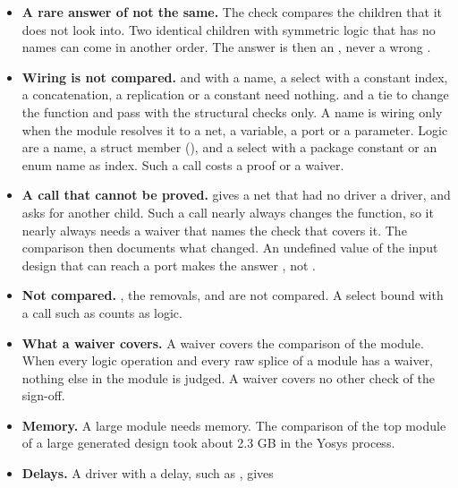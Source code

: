 \begin{itemize}
  That edge assumes every output of a child depends on every other pin of it, which is not
  always true. A value that reads a net which a child drives, and which does not in fact
  carry the loop, is refused as well. A package constant, such as , is refused
  although it can never be part of a loop. Its first name is not a member of the module.
\item \textbf{A rare answer of not the same.} The check compares the children that it does
  not look into. Two identical children with symmetric logic that has no names can come in
  another order. The answer is then an , never a wrong .
\item \textbf{Wiring is not compared.}  and
   with a name, a select with a constant index, a concatenation,
  a replication or a constant need nothing.  and a tie to
   change the function and pass with the structural checks only. A name is
  wiring only when the module resolves it to a net, a variable, a port or a parameter.
  Logic are a  name, a struct member (), and a select
  with a package constant or an enum name as index. Such a call costs a proof or a waiver.
\item \textbf{A call that cannot be proved.}  gives a net that had
  no driver a driver, and  asks for another child. Such a call
  nearly always changes the function, so it nearly always needs a waiver that names the check
  that covers it. The comparison then documents what changed. An undefined value of the input
  design that can reach a port makes the answer , not .
\item \textbf{Not compared.} , the removals,
   and  are not compared. A select
  bound with a call such as  counts as logic.
\item \textbf{What a waiver covers.} A waiver covers the comparison of the module. When
  every logic operation and every raw splice of a module has a waiver, nothing else in the
  module is judged. A waiver covers no other check of the sign-off.
\item \textbf{Memory.} A large module needs memory. The comparison of the top module of a
  large generated design took about 2.3 GB in the Yosys process.
\item \textbf{Delays.} A driver with a delay, such as , gives

\end{itemize}
